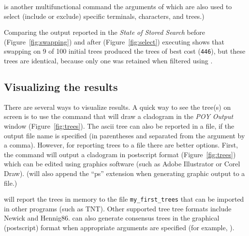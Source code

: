  is another multifunctional command the arguments of which are also used to select (include or exclude) specific terminals, characters, and trees.)

Comparing the output reported in the \emph{State of Stored Search} before (Figure~\ref{fig:swapping}) and after (Figure~\ref{fig:select}) executing  shows that swapping on 9 of 100 initial trees produced the trees of best cost (\texttt{446}), but these trees are identical, because only one was retained when filtered using .

\subsection{Visualizing the results}

There are several ways to visualize results. A quick way to see the tree(s) on screen is to use the command  that will draw a cladogram in the \emph{POY Output} window (Figure~\ref{fig:trees}). The ascii tree can also be reported in a file, if the output file name is specified (in parentheses and separated from the argument  by a comma). However, for reporting trees to a file there are better options. First, the command  will output a cladogram in postscript format (Figure~\ref{fig:trees}) which can be edited using graphics software (such as Adobe Illustrator or Corel Draw). (\poy will also append the ``ps'' extension when generating graphic output to a file.)

 will report the trees in memory to the file \texttt{my\_first\_trees} that can be imported in other programs (such as TNT). Other supported tree tree formats include Newick and Hennig86.  can also generate consensus trees in the graphical (postscript) format when appropriate arguments are specified (for example, ).

